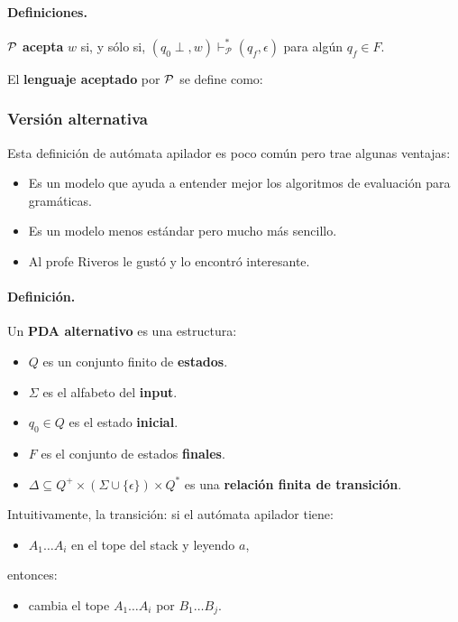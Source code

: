 \paragraph*{Definiciones.} $\cal{P}$ \textbf{acepta} $w$ si, y sólo si, $\left(q_0 \perp, w\right) \vdash_{\mathcal{P}}^*\left(q_f, \epsilon\right)$ para algún $q_f \in F$.

\hspace{70pt} El \textbf{lenguaje aceptado} por $\mathcal{P}$ se define como:

\subsubsection{Versión alternativa}
Esta definición de autómata apilador es poco común pero trae algunas ventajas:
\begin{itemize}
    \item Es un modelo que ayuda a entender mejor los algoritmos de evaluación para gramáticas.
    \item Es un modelo menos estándar pero mucho más sencillo.
    \item Al profe Riveros le gustó y lo encontró interesante.
\end{itemize}

\paragraph*{Definición.} Un \textbf{PDA alternativo} es una estructura:
\begin{itemize}
    \item $Q$ es un conjunto finito de \textbf{estados}.
    \item $\Sigma$ es el alfabeto del \textbf{input}.
    \item $q_0 \in Q$ es el estado \textbf{inicial}.
    \item $F$ es el conjunto de estados \textbf{finales}.
    \item $\Delta \subseteq Q^+ \times (\Sigma \cup \{\epsilon\})\times Q^*$ es una \textbf{relación finita de transición}.
\end{itemize}
Intuitivamente, la transición:
si el autómata apilador tiene:
\begin{itemize}
    \item $A_1\ldots A_i$ en el tope del stack y leyendo $a$,
\end{itemize}
entonces:
\begin{itemize}
    \item cambia el tope $A_1\ldots A_i$ por $B_1\ldots B_j$.
\end{itemize}


